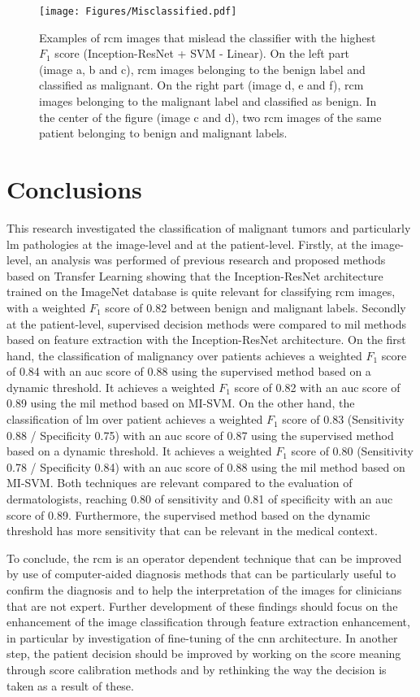 \documentclass[journal,article,accept,moreauthors,pdftex, applsci]{Definitions/mdpi}
\newcommand{\fscore}{$F_{1}$ score}
\begin{document}
\begin{figure}[H]
    \centering
    \texttt{[image: Figures/Misclassified.pdf]}
    \caption{Examples of \ac{rcm} images that mislead the classifier with the highest \fscore{} (Inception-ResNet + SVM - Linear). On the left part (image a, b and c), \ac{rcm} images belonging to the benign label and classified as malignant. On the right part (image d, e and f), \ac{rcm} images belonging to the malignant label and classified as benign. In the center of the figure (image c and d), two \ac{rcm} images of the same patient belonging to benign and malignant labels.}
    \label{fig:misclassified}
\end{figure}
\section{Conclusions}
\label{sec:conclusions}
This research investigated the classification of malignant tumors and particularly \ac{lm} pathologies at the image-level and at the patient-level. Firstly, at the image-level, an analysis was performed of previous research and proposed methods based on Transfer Learning showing that the Inception-ResNet architecture trained on the ImageNet database is quite relevant for classifying \ac{rcm} images, with a weighted \fscore{} of 0.82 between benign and malignant labels. Secondly at the patient-level, supervised decision methods were compared to \ac{mil} methods based on feature extraction with the Inception-ResNet architecture. On the first hand, the classification of malignancy over patients achieves a weighted \fscore{} of 0.84 with an \ac{auc} score of 0.88 using the supervised method based on a dynamic threshold. It achieves a weighted \fscore{} of 0.82 with an \ac{auc} score of 0.89 using the \ac{mil} method based on MI-SVM. On the other hand, the classification of \ac{lm} over patient achieves a weighted \fscore{} of 0.83 (Sensitivity 0.88 / Specificity 0.75) with an \ac{auc} score of 0.87 using the supervised method based on a dynamic threshold. It achieves a weighted \fscore{} of 0.80 (Sensitivity 0.78 / Specificity 0.84) with an \ac{auc} score of 0.88 using the \ac{mil} method based on MI-SVM. Both techniques are relevant compared to the evaluation of dermatologists, reaching 0.80 of sensitivity and 0.81 of specificity with an \ac{auc} score of 0.89. Furthermore, the supervised method based on the dynamic threshold has more sensitivity that can be relevant in the medical context.\par
To conclude, the \ac{rcm} is an operator dependent technique that can be improved by use of computer-aided diagnosis methods that can be particularly useful to confirm the diagnosis and to help the interpretation of the images for clinicians that are not expert. Further development of these findings should focus on the enhancement of the image classification through feature extraction enhancement, in particular by investigation of fine-tuning of the \ac{cnn} architecture. In another step, the patient decision should be improved by working on the score meaning through score calibration methods and by rethinking the way the decision is taken as a result of these.\par
\end{document}
